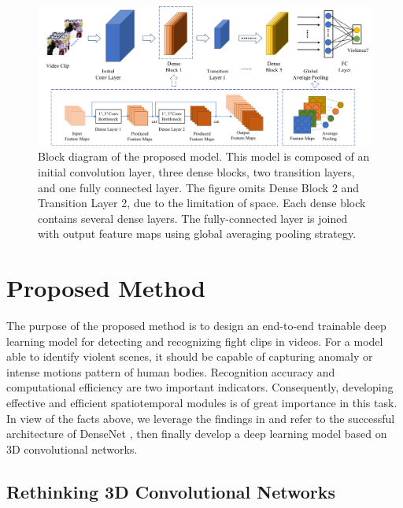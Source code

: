 \documentclass[10pt,twocolumn,letterpaper]{article}
\begin{document}
\begin{figure}
\begin{center}
\includegraphics[scale=0.52]{fig/fig1.png}
\end{center}
\caption{Block diagram of the proposed model. This model is composed of an initial convolution layer, three dense blocks, two transition layers, and one fully connected layer. The figure omits Dense Block 2 and Transition Layer 2, due to the limitation of space. Each dense block contains several dense layers. The fully-connected layer is joined with output feature maps using global averaging pooling strategy.}
\label{fig:model}
\end{figure}
	
	

\section{Proposed Method}
\label{sec:3}

The purpose of the proposed method is to design an end-to-end trainable deep learning model for detecting and recognizing fight clips in videos. 
For a model able to identify violent scenes, it should be capable of capturing anomaly or intense motions pattern of human bodies. 
Recognition accuracy and computational efficiency are two important indicators.
Consequently, developing effective and efficient spatiotemporal modules is of great importance in this task.
In view of the facts above, we leverage the findings in \cite{3dcnn_1, 3dcnn_2, r2+1d} and refer to the successful architecture of DenseNet \cite{densenet}, then finally develop a deep learning model based on 3D convolutional networks.

\subsection{Rethinking 3D Convolutional Networks}
\end{document}
